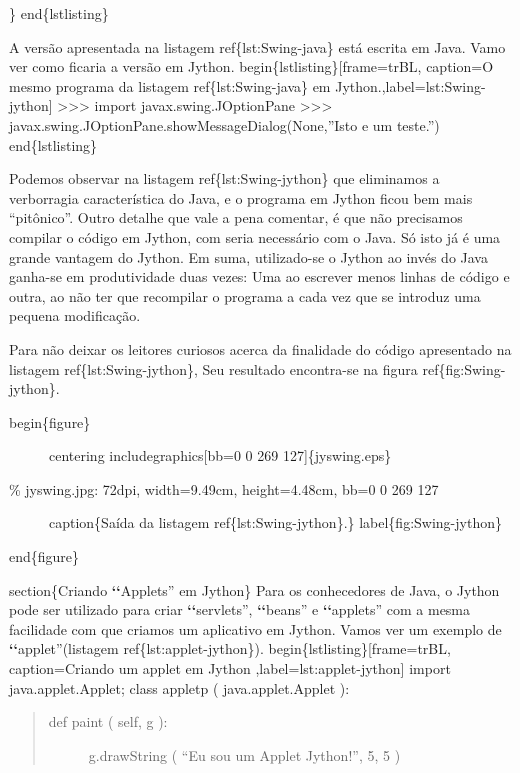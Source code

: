 \documentclass[a4paper,10pt,brazil]{sphinxmanual}
\begin{document}
\}
end\{lstlisting\}

A versão apresentada na listagem ref\{lst:Swing-java\} está escrita em Java. Vamo ver como ficaria a versão em Jython.
begin\{lstlisting\}{[}frame=trBL, caption=O mesmo programa da listagem ref\{lst:Swing-java\} em Jython.,label=lst:Swing-jython{]}
\textgreater{}\textgreater{}\textgreater{} import javax.swing.JOptionPane
\textgreater{}\textgreater{}\textgreater{} javax.swing.JOptionPane.showMessageDialog(None,''Isto e um teste.'')
end\{lstlisting\}

Podemos observar na listagem ref\{lst:Swing-jython\} que eliminamos a verborragia característica do Java, e o programa em Jython ficou bem mais ``pitônico''. Outro detalhe que vale a pena comentar, é que não precisamos compilar o código em Jython, com seria necessário com o Java. Só isto já é uma grande vantagem do Jython. Em suma, utilizado-se o Jython ao invés do Java ganha-se em produtividade duas vezes: Uma ao escrever menos linhas de código e outra, ao não ter que recompilar o programa a cada vez que se introduz uma pequena modificação.

Para não deixar os leitores curiosos acerca da finalidade do código apresentado na listagem ref\{lst:Swing-jython\}, Seu resultado encontra-se na figura ref\{fig:Swing-jython\}.
\begin{description}
\item[{begin\{figure\}}] \leavevmode
centering
includegraphics{[}bb=0 0 269 127{]}\{jyswing.eps\}

\item[{\% jyswing.jpg: 72dpi, width=9.49cm, height=4.48cm, bb=0 0 269 127}] \leavevmode
caption\{Saída da listagem ref\{lst:Swing-jython\}.\}
label\{fig:Swing-jython\}

\end{description}

end\{figure\}

section\{Criando {\color{red}\bfseries{}{}`{}`}Applets'' em Jython\}
Para os conhecedores de Java, o Jython pode ser utilizado para criar {\color{red}\bfseries{}{}`{}`}servlets'', {\color{red}\bfseries{}{}`{}`}beans'' e {\color{red}\bfseries{}{}`{}`}applets'' com a mesma facilidade com que criamos um aplicativo em Jython. Vamos ver um exemplo de {\color{red}\bfseries{}{}`{}`}applet''(listagem ref\{lst:applet-jython\}).
begin\{lstlisting\}{[}frame=trBL, caption=Criando um applet em Jython ,label=lst:applet-jython{]}
import java.applet.Applet;
class appletp ( java.applet.Applet ):
\begin{quote}
\begin{description}
\item[{def paint ( self, g ):}] \leavevmode
g.drawString ( ``Eu sou um Applet Jython!'', 5, 5 )

\end{description}
\end{quote}
\end{document}
